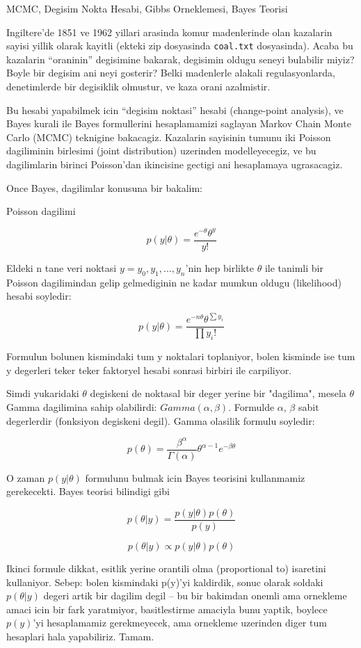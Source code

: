 \documentclass[12pt,fleqn]{article}
\begin{document}
MCMC, Degisim Nokta Hesabi, Gibbs Orneklemesi, Bayes Teorisi

Ingiltere'de 1851 ve 1962 yillari arasinda komur madenlerinde olan
kazalarin sayisi yillik olarak kayitli (ekteki zip dosyasinda
\verb!coal.txt! dosyasinda). Acaba bu kazalarin ``oraninin'' degisimine
bakarak, degisimin oldugu seneyi bulabilir miyiz? Boyle bir degisim ani
neyi gosterir? Belki madenlerle alakali regulasyonlarda, denetimlerde bir
degisiklik olmustur, ve kaza orani azalmistir.

Bu hesabi yapabilmek icin ``degisim noktasi'' hesabi (change-point
analysis), ve Bayes kurali ile Bayes formullerini hesaplamamizi
saglayan Markov Chain Monte Carlo (MCMC) teknigine
bakacagiz. Kazalarin sayisinin tumunu iki Poisson dagiliminin
birlesimi (joint distribution) uzerinden modelleyecegiz, ve bu
dagilimlarin birinci Poisson'dan ikincisine gectigi ani hesaplamaya
ugrasacagiz.

Once Bayes, dagilimlar konusuna bir bakalim:

Poisson dagilimi

\[ p(y|\theta) = \frac{e^{-\theta}\theta^y}{y!} \]

Eldeki n tane veri noktasi $y=y_0, y_1,...,y_n$'nin hep birlikte
$\theta$ ile tanimli bir Poisson dagilimindan gelip gelmediginin ne
kadar mumkun oldugu (likelihood) hesabi soyledir:

\[ p(y|\theta) = \frac{e^{-n\theta}\theta^{\sum y_i}}{\prod y_i!}  \]

Formulun bolunen kismindaki tum y noktalari toplaniyor, bolen kisminde
ise tum y degerleri teker teker faktoryel hesabi sonrasi birbiri ile
carpiliyor.

Simdi yukaridaki $\theta$ degiskeni de noktasal bir deger yerine bir
"dagilima", mesela $\theta$ Gamma dagilimina sahip olabilirdi:
$Gamma(\alpha, \beta)$. Formulde $\alpha$, $\beta$ sabit degerlerdir
(fonksiyon degiskeni degil). Gamma olasilik formulu soyledir:

\[ p(\theta) = \frac{\beta^\alpha}{\Gamma(\alpha)}\theta^{\alpha-1}e^{-\beta\theta} \]

O zaman $p(y|\theta)$ formulunu bulmak icin Bayes teorisini
kullanmamiz gerekecekti. Bayes teorisi bilindigi gibi

\[ p(\theta|y) = \frac{p(y|\theta)p(\theta)}{p(y)} \]

\[ p(\theta|y) \propto p(y|\theta)p(\theta) \]

Ikinci formule dikkat, esitlik yerine orantili olma (proportional to)
isaretini kullaniyor. Sebep: bolen kismindaki p(y)'yi kaldirdik, sonuc
olarak soldaki $p(\theta|y)$ degeri artik bir dagilim degil -- bu bir
bakimdan onemli ama ornekleme amaci icin bir fark yaratmiyor,
basitlestirme amaciyla bunu yaptik, boylece $p(y)$'yi hesaplamamiz
gerekmeyecek, ama ornekleme uzerinden diger tum hesaplari hala
yapabiliriz. Tamam.
\end{document}
